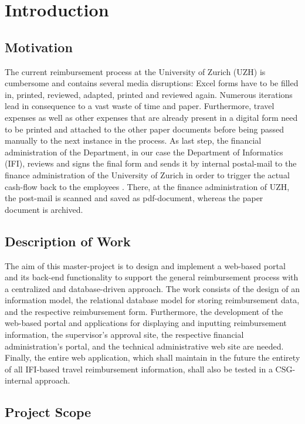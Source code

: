 \chapter{Introduction}

\section{Motivation}

The current reimbursement process at the University of Zurich (UZH) is cumbersome and contains several media disruptions: Excel forms have to be filled in, printed, reviewed, adapted, printed and reviewed again. Numerous iterations lead in consequence to a vast waste of time and paper. Furthermore, travel expenses as well as other expenses that are already present in a digital form need to be printed and attached to the other paper documents before being passed manually to the next instance in the process. As last step, the financial administration of the Department, in our case the Department of Informatics (IFI), reviews and signs the final form and sends it by internal postal-mail to the finance administration of the University of Zurich in order to trigger the actual cash-flow back to the employees \cite{ifi}. There, at the finance administration of UZH, the post-mail is scanned and saved as pdf-document, whereas the paper document is archived.

\section{Description of Work}

The aim of this master-project is to design and implement a web-based portal and its back-end functionality to support the general reimbursement process with a centralized and database-driven approach. The work consists of the design of an information model, the relational database model for storing reimbursement data, and the respective reimbursement form. Furthermore, the development of the web-based portal and applications for displaying and inputting reimbursement information, the supervisor’s approval site, the respective financial administration’s portal, and the technical administrative web site are needed. Finally, the entire web application, which shall maintain in the future the entirety of all IFI-based travel reimbursement information, shall also be tested in a CSG-internal approach.


\section{Project Scope}

